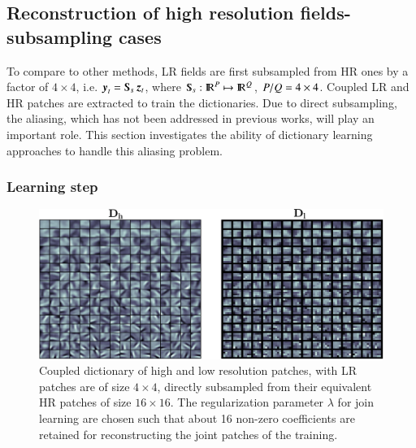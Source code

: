 \subsection{Reconstruction of high resolution fields- subsampling cases}
To compare to other methods, LR fields are first subsampled from HR ones by a factor of $ 4 \times 4 $, i.e. $ \y_t = \Sub_s \z_t $, where $ \Sub_s: \R^\dimsh \mapsto \R^\dimsl $, $ P/Q = 4 \times 4 $. Coupled LR and HR patches are extracted to train the dictionaries. Due to direct subsampling, the aliasing, which has not been addressed in previous works, will play an important role. This section investigates the ability of dictionary learning approaches to handle this aliasing problem.

\subsubsection*{Learning step}
\begin{figure}[t]
\centering
	\includegraphics[width=\textwidth]{./images/DL/SR_sspacing04/subsampling/coupleddictionary_HRLR_lambda010.eps}
	\caption{\label{fig:D_HR_LR} Coupled dictionary of high and low resolution patches, with LR patches are of size $ 4\times 4 $, directly subsampled from their equivalent HR patches of size $ 16 \times 16 $. The regularization parameter $ \lambda $ for join learning are chosen such that about 16 non-zero coefficients are retained for reconstructing the joint patches of the training.}
\end{figure}

